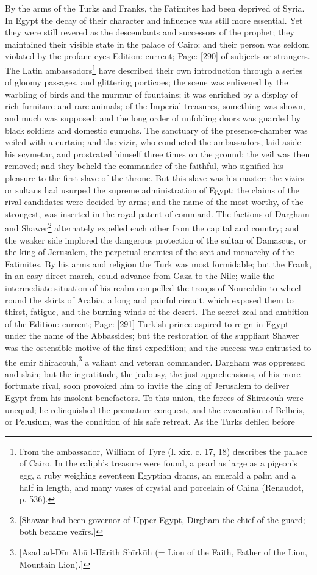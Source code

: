 By the arms of the Turks and Franks, the Fatimites had been deprived of Syria. In Egypt the decay of their character and influence was still more essential. Yet they were still revered as the descendants and successors of the prophet; they maintained their visible state in the palace of Cairo; and their person was seldom violated by the profane eyes Edition: current; Page: [290] of subjects or strangers. The Latin ambassadors\footnote{From the ambassador, William of Tyre (l. xix. c. 17, 18) describes the palace of Cairo. In the caliph\texthebrew{}’s treasure were found, a pearl as large as a pigeon\texthebrew{}’s egg, a ruby weighing seventeen Egyptian drams, an emerald a palm and a half in length, and many vases of crystal and porcelain of China (Renaudot, p. 536).} have described their own introduction through a series of gloomy passages, and glittering porticoes; the scene was enlivened by the warbling of birds and the murmur of fountains; it was enriched by a display of rich furniture and rare animals; of the Imperial treasures, something was shown, and much was supposed; and the long order of unfolding doors was guarded by black soldiers and domestic eunuchs. The sanctuary of the presence-chamber was veiled with a curtain; and the vizir, who conducted the ambassadors, laid aside his scymetar, and prostrated himself three times on the ground; the veil was then removed; and they beheld the commander of the faithful, who signified his pleasure to the first slave of the throne. But this slave was his master; the vizirs or sultans had usurped the supreme administration of Egypt; the claims of the rival candidates were decided by arms; and the name of the most worthy, of the strongest, was inserted in the royal patent of command. The factions of Dargham and Shawer\footnote{[Shāwar had been governor of Upper Egypt, Dirghām the chief of the guard; both became vezīrs.]} alternately expelled each other from the capital and country; and the weaker side implored the dangerous protection of the sultan of Damascus, or the king of Jerusalem, the perpetual enemies of the sect and monarchy of the Fatimites. By his arms and religion the Turk was most formidable; but the Frank, in an easy direct march, could advance from Gaza to the Nile; while the intermediate situation of his realm compelled the troops of Noureddin to wheel round the skirts of Arabia, a long and painful circuit, which exposed them to thirst, fatigue, and the burning winds of the desert. The secret zeal and ambition of the Edition: current; Page: [291] Turkish prince aspired to reign in Egypt under the name of the Abbassides; but the restoration of the suppliant Shawer was the ostensible motive of the first expedition; and the success was entrusted to the emir Shiracouh,\footnote{[Asad ad-Dīn Abū l-Hārith Shīrkūh (= Lion of the Faith, Father of the Lion, Mountain Lion).]} a valiant and veteran commander. Dargham was oppressed and slain; but the ingratitude, the jealousy, the just apprehensions, of his more fortunate rival, soon provoked him to invite the king of Jerusalem to deliver Egypt from his insolent benefactors. To this union, the forces of Shiracouh were unequal; he relinquished the premature conquest; and the evacuation of Belbeis, or Pelusium, was the condition of his safe retreat. As the Turks defiled before 